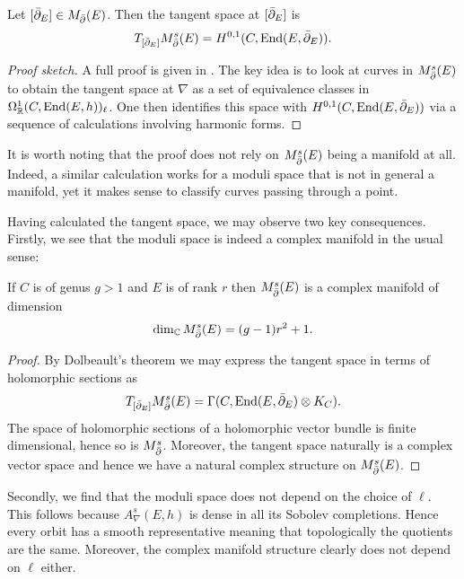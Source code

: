 \documentclass[12pt]{ociamthesis}  %
\begin{document}
\begin{theorem}
  Let $[{\bar{\partial}}_E]\in M_{\bar{\partial}}(E)$. Then the tangent space at $[{\bar{\partial}}_E]$ is
  \begin{align*}
    T_{[{\bar{\partial}}_E]}M^s_{\bar{\partial}}(E) = H^{0,1}(C,\operatorname{End}(E,{\bar{\partial}}_E)).
  \end{align*}
  \begin{proof}[Proof sketch]
    A full proof is given in \cite[223-225]{kobayashi1987}. The key idea is to look
    at curves in $M^s_{\bar{\partial}}(E)$ to obtain the tangent space at $\nabla$ as a set of
    equivalence classes in $\Omega^1_{\mathbb{R}}(C,\operatorname{End}(E,h))_\ell$. One then
    identifies this space with $H^{0,1}(C,\operatorname{End}(E,{\bar{\partial}}_E))$ via a sequence of calculations
    involving harmonic forms.
  \end{proof}
\end{theorem}

It is worth noting that the proof does not rely on $M^s_{\bar{\partial}}(E)$ being a manifold
at all. Indeed, a similar calculation works for a moduli space that is not
in general a manifold, yet it makes sense to classify curves passing through a point.

Having calculated the tangent space, we may observe two key consequences.
Firstly, we see that the moduli space is indeed a complex manifold in the usual sense:

\begin{corollary}
  If $C$ is of genus $g>1$ and $E$ is of rank $r$ then
  $M^s_{\bar{\partial}}(E)$ is a complex manifold of dimension
  \begin{align*}
    \dim_{\mathbb{C}} M^s_{\bar{\partial}}(E) = (g-1)r^2 + 1.
  \end{align*}
  \begin{proof}
    By Dolbeault's theorem we may express the tangent space in terms of holomorphic
    sections as
    \begin{align*}
      T_{[{\bar{\partial}}_E]}M^s_{\bar{\partial}}(E) = \Gamma(C,\operatorname{End}(E,{\bar{\partial}}_E) \otimes K_C).
    \end{align*}
    The space of holomorphic sections of a holomorphic vector bundle is finite dimensional,
    hence so is $M^s_{\bar{\partial}}$. Moreover, the tangent space naturally is a complex vector
    space and hence we have a natural complex structure on $M^s_{\bar{\partial}}(E)$.

  \end{proof}
\end{corollary}

Secondly, we find that the moduli space does not depend on the
choice of $\ell$. This follows because $A_\nabla^{s}(E,h)$
is dense in all its Sobolev completions. Hence every orbit has a
smooth representative meaning that topologically the quotients are
the same. Moreover, the complex manifold structure clearly
does not depend on $\ell$ either.
\end{document}
